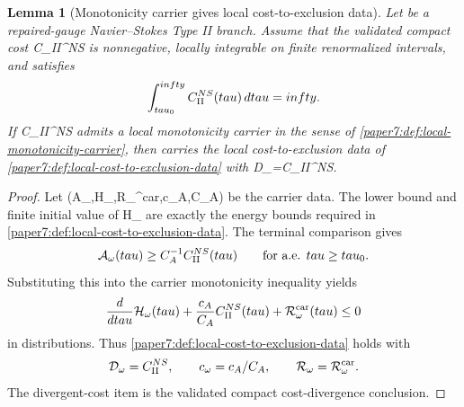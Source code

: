 \documentclass[11pt]{amsart}
\def\({}%
\def\){}%
\def\mathfrak#1{#1}%
\def\tau{tau}%
\def\infty{infty}%
\theoremstyle{plain}
\newtheorem{lemma}[lemma]{Lemma}
\theoremstyle{definition}
\theoremstyle{remark}
\begin{document}
\begin{lemma}[Monotonicity carrier gives local cost-to-exclusion data]
\label{paper7:lem:monotonicity-carrier-gives-cost-to-exclusion-data}
Let \(\omega\) be a repaired-gauge Navier--Stokes Type II branch.  Assume that
the validated compact cost \(\mathfrak C_{\rm II}^{NS}\) is nonnegative,
locally integrable on finite renormalized intervals, and satisfies
\[
  \int_{\tau_0}^{\infty}
  \mathfrak C_{\rm II}^{NS}(\tau)\,d\tau=\infty .
\]
If \(\mathfrak C_{\rm II}^{NS}\) admits a local monotonicity carrier in the
sense of \cref{paper7:def:local-monotonicity-carrier}, then \(\omega\) carries
the local cost-to-exclusion data of
\cref{paper7:def:local-cost-to-exclusion-data} with
\(\mathcal D_\omega=\mathfrak C_{\rm II}^{NS}\).
\end{lemma}

\begin{proof}
Let
\((\mathcal A_\omega,\mathcal H_\omega,\mathcal R_\omega^{\rm car},c_A,C_A)\)
be the carrier data.  The lower bound and finite initial value of
\(\mathcal H_\omega\) are exactly the energy bounds required in
\cref{paper7:def:local-cost-to-exclusion-data}.  The terminal comparison gives
\[
  \mathcal A_\omega(\tau)
  \ge C_A^{-1}\mathfrak C_{\rm II}^{NS}(\tau)
  \qquad\text{for a.e. }\tau\ge\tau_0 .
\]
Substituting this into the carrier monotonicity inequality yields
\[
  \frac{d}{d\tau}\mathcal H_\omega(\tau)
  +\frac{c_A}{C_A}\mathfrak C_{\rm II}^{NS}(\tau)
  +\mathcal R_\omega^{\rm car}(\tau)\le0
\]
in distributions.  Thus
\cref{paper7:def:local-cost-to-exclusion-data} holds with
\[
  \mathcal D_\omega=\mathfrak C_{\rm II}^{NS},
  \qquad c_\omega=c_A/C_A,
  \qquad \mathcal R_\omega=\mathcal R_\omega^{\rm car}.
\]
The divergent-cost item is the validated compact cost-divergence conclusion.
\end{proof}
\end{document}
